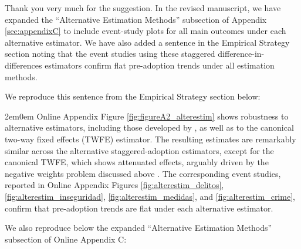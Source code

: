 
Thank you very much for the suggestion. In the revised manuscript, we have expanded the ``Alternative Estimation Methods'' subsection of Appendix \ref{sec:appendixC} to include event-study plots for all main outcomes under each alternative estimator. We have also added a sentence in the Empirical Strategy section noting that the event studies using these staggered difference-in-differences estimators confirm flat pre-adoption trends under all estimation methods.

We reproduce this sentence from the Empirical Strategy section below:

\begin{adjustwidth}{2em}{0em}
Online Appendix Figure \ref{fig:figureA2_alterestim} shows robustness to alternative estimators, including those developed by \citet{Chaisemartin, Gardner, wooldridge2023simple}, as well as to the canonical two-way fixed effects (TWFE) estimator. The resulting estimates are remarkably similar across the alternative staggered-adoption estimators, except for the canonical TWFE, which shows attenuated effects, arguably driven by the negative weights problem discussed above \citep{GoodmanBacon}. The corresponding event studies, reported in Online Appendix Figures \ref{fig:alterestim_delitos}, \ref{fig:alterestim_inseguridad}, \ref{fig:alterestim_medidas}, and \ref{fig:alterestim_crime}, confirm that pre-adoption trends are flat under each alternative estimator.
\end{adjustwidth}

We also reproduce below the expanded ``Alternative Estimation Methods'' subsection of Online Appendix C:

